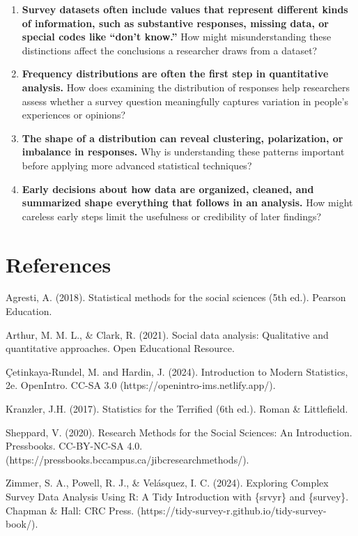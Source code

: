 \documentclass[
  letterpaper,
  DIV=11,
  numbers=noendperiod]{scrreprt}
\begin{document}
\begin{enumerate}
\def\labelenumi{\arabic{enumi}.}
\item
  \textbf{Survey datasets often include values that represent different
  kinds of information, such as substantive responses, missing data, or
  special codes like ``don't know.''} How might misunderstanding these
  distinctions affect the conclusions a researcher draws from a dataset?
\item
  \textbf{Frequency distributions are often the first step in
  quantitative analysis.} How does examining the distribution of
  responses help researchers assess whether a survey question
  meaningfully captures variation in people's experiences or opinions?
\item
  \textbf{The shape of a distribution can reveal clustering,
  polarization, or imbalance in responses.} Why is understanding these
  patterns important before applying more advanced statistical
  techniques?
\item
  \textbf{Early decisions about how data are organized, cleaned, and
  summarized shape everything that follows in an analysis.} How might
  careless early steps limit the usefulness or credibility of later
  findings?
\end{enumerate}

\section{References}\label{references}

Agresti, A. (2018). Statistical methods for the social sciences (5th
ed.). Pearson Education.

Arthur, M. M. L., \& Clark, R. (2021). Social data analysis: Qualitative
and quantitative approaches. Open Educational Resource.

Çetinkaya-Rundel, M. and Hardin, J. (2024). Introduction to Modern
Statistics, 2e. OpenIntro. CC-SA 3.0
(https://openintro-ims.netlify.app/).

Kranzler, J.H. (2017). Statistics for the Terrified (6th ed.). Roman \&
Littlefield.

Sheppard, V. (2020). Research Methods for the Social Sciences: An
Introduction. Pressbooks. CC-BY-NC-SA 4.0.
(https://pressbooks.bccampus.ca/jibcresearchmethods/).

Zimmer, S. A., Powell, R. J., \& Velásquez, I. C. (2024). Exploring
Complex Survey Data Analysis Using R: A Tidy Introduction with \{srvyr\}
and \{survey\}. Chapman \& Hall: CRC Press.
(https://tidy-survey-r.github.io/tidy-survey-book/).
\end{document}
